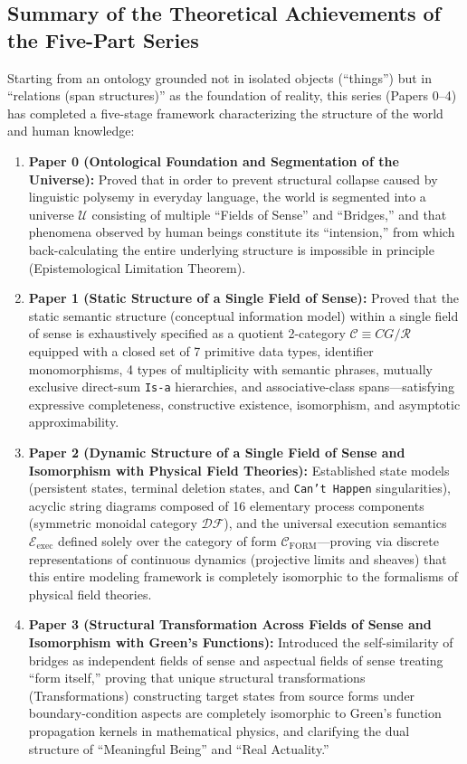 \documentclass[11pt,a4paper]{article}
\theoremstyle{definition}
\theoremstyle{plain}
\begin{document}
\subsection{Summary of the Theoretical Achievements of the Five-Part Series}
Starting from an ontology grounded not in isolated objects (``things'') but in ``relations (span structures)'' as the foundation of reality, this series (Papers 0--4) has completed a five-stage framework characterizing the structure of the world and human knowledge:

\begin{enumerate}
    \item \textbf{Paper 0 (Ontological Foundation and Segmentation of the Universe):} Proved that in order to prevent structural collapse caused by linguistic polysemy in everyday language, the world is segmented into a universe $\mathcal{U}$ consisting of multiple ``Fields of Sense'' and ``Bridges,'' and that phenomena observed by human beings constitute its ``intension,'' from which back-calculating the entire underlying structure is impossible in principle (Epistemological Limitation Theorem).
    \item \textbf{Paper 1 (Static Structure of a Single Field of Sense):} Proved that the static semantic structure (conceptual information model) within a single field of sense is exhaustively specified as a quotient 2-category $\mathcal{C} \equiv CG/\mathcal{R}$ equipped with a closed set of 7 primitive data types, identifier monomorphisms, 4 types of multiplicity with semantic phrases, mutually exclusive direct-sum \texttt{Is-a} hierarchies, and associative-class spans---satisfying expressive completeness, constructive existence, isomorphism, and asymptotic approximability.
    \item \textbf{Paper 2 (Dynamic Structure of a Single Field of Sense and Isomorphism with Physical Field Theories):} Established state models (persistent states, terminal deletion states, and \texttt{Can't Happen} singularities), acyclic string diagrams composed of 16 elementary process components (symmetric monoidal category $\mathcal{DF}$), and the universal execution semantics $\mathcal{E}_{\mathrm{exec}}$ defined solely over the category of form $\mathcal{C}_{\mathrm{FORM}}$---proving via discrete representations of continuous dynamics (projective limits and sheaves) that this entire modeling framework is completely isomorphic to the formalisms of physical field theories.
    \item \textbf{Paper 3 (Structural Transformation Across Fields of Sense and Isomorphism with Green's Functions):} Introduced the self-similarity of bridges as independent fields of sense and aspectual fields of sense treating ``form itself,'' proving that unique structural transformations (Transformations) constructing target states from source forms under boundary-condition aspects are completely isomorphic to Green's function propagation kernels in mathematical physics, and clarifying the dual structure of ``Meaningful Being'' and ``Real Actuality.''

\end{enumerate}
\end{document}
